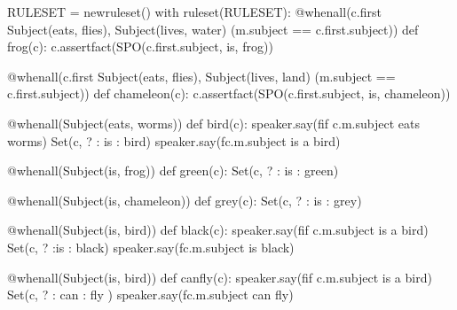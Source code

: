 \documentclass[letterpaper,10pt,english]{sphinxmanual}
\begin{document}
{{
\begin{sphinxVerbatim}[commandchars=\\\{\}]
\llap{\color{nbsphinxin}[ ]:\,\hspace{\fboxrule}\hspace{\fboxsep}}RULESET = new\PYGZus{}ruleset()
with ruleset(RULESET):
    @when\PYGZus{}all(c.first \PYGZlt{}\PYGZlt{} Subject(\PYGZsq{}eats\PYGZsq{}, \PYGZsq{}flies\PYGZsq{}),
              Subject(\PYGZsq{}lives\PYGZsq{}, \PYGZsq{}water\PYGZsq{}) \PYGZam{} (m.subject == c.first.subject))
    def frog(c):
        c.assert\PYGZus{}fact(SPO(c.first.subject, \PYGZsq{}is\PYGZsq{}, \PYGZsq{}frog\PYGZsq{}))

    @when\PYGZus{}all(c.first \PYGZlt{}\PYGZlt{} Subject(\PYGZsq{}eats\PYGZsq{}, \PYGZsq{}flies\PYGZsq{}),
              Subject(\PYGZsq{}lives\PYGZsq{}, \PYGZsq{}land\PYGZsq{}) \PYGZam{} (m.subject == c.first.subject))
    def chameleon(c):
        c.assert\PYGZus{}fact(SPO(c.first.subject, \PYGZsq{}is\PYGZsq{}, \PYGZsq{}chameleon\PYGZsq{}))

    @when\PYGZus{}all(Subject(\PYGZsq{}eats\PYGZsq{}, \PYGZsq{}worms\PYGZsq{}))
    def bird(c):
        speaker.say(f\PYGZsq{}if \PYGZob{}c.m.subject\PYGZcb{} eats worms\PYGZsq{})
        Set(c, \PYGZsq{}? : is : bird\PYGZsq{})
        speaker.say(f\PYGZsq{}\PYGZob{}c.m.subject\PYGZcb{} is a bird\PYGZsq{})

    @when\PYGZus{}all(Subject(\PYGZsq{}is\PYGZsq{}, \PYGZsq{}frog\PYGZsq{}))
    def green(c):
        Set(c, \PYGZsq{}? : is : green\PYGZsq{})

    @when\PYGZus{}all(Subject(\PYGZsq{}is\PYGZsq{}, \PYGZsq{}chameleon\PYGZsq{}))
    def grey(c):
        Set(c, \PYGZsq{}? : is : grey\PYGZsq{})

    @when\PYGZus{}all(Subject(\PYGZsq{}is\PYGZsq{}, \PYGZsq{}bird\PYGZsq{}))
    def black(c):
        speaker.say(f\PYGZsq{}if \PYGZob{}c.m.subject\PYGZcb{} is a bird\PYGZsq{})
        Set(c, \PYGZsq{}? :is : black\PYGZsq{})
        speaker.say(f\PYGZsq{}\PYGZob{}c.m.subject\PYGZcb{} is black\PYGZsq{})

    @when\PYGZus{}all(Subject(\PYGZdq{}is\PYGZdq{}, \PYGZdq{}bird\PYGZdq{}))
    def can\PYGZus{}fly(c):
        speaker.say(f\PYGZsq{}if \PYGZob{}c.m.subject\PYGZcb{} is a bird\PYGZsq{})
        Set(c, \PYGZsq{}? : can : fly\PYGZsq{} )
        speaker.say(f\PYGZsq{}\PYGZob{}c.m.subject\PYGZcb{} can fly\PYGZsq{})


\end{sphinxVerbatim}}}
\end{document}
